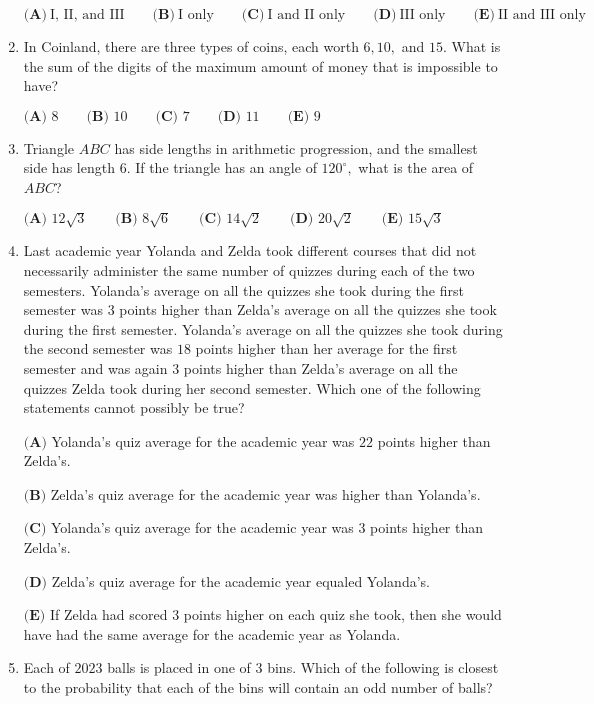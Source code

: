 \documentclass{article}
\begin{document}
\begin{enumerate}[label=\arabic*., itemsep=0.5em]
\(\textbf{(A)}~\text{I, II, and III}\qquad\textbf{(B)}~\text{I only}\qquad\textbf{(C)}~\text{I and II only}\qquad\textbf{(D)}~\text{III only}\qquad\textbf{(E)}~\text{II and III only}\)\par \vspace{0.5em}\item In Coinland, there are three types of coins, each worth \(6, 10,\) and \(15.\) What is the sum of the digits of the maximum amount of money that is impossible to have?

\(\textbf{(A) }8\qquad\textbf{(B) }10\qquad\textbf{(C) }7\qquad\textbf{(D) }11\qquad\textbf{(E) }9\)\par \vspace{0.5em}\item Triangle \(ABC\) has side lengths in arithmetic progression, and the smallest side has length \(6\). If the triangle has an angle of \(120^\circ,\) what is the area of \(ABC\)?

\(\textbf{(A) }12\sqrt{3}\qquad\textbf{(B) }8\sqrt{6}\qquad\textbf{(C) }14\sqrt{2}\qquad\textbf{(D) }20\sqrt{2}\qquad\textbf{(E) }15\sqrt{3}\)\par \vspace{0.5em}\item Last academic year Yolanda and Zelda took different courses that did not necessarily administer the same number of quizzes during each of the two semesters. Yolanda's average on all the quizzes she took during the first semester was \(3\) points higher than Zelda's average on all the quizzes she took during the first semester. Yolanda's average on all the quizzes she took during the second semester was \(18\) points higher than her average for the first semester and was again \(3\) points higher than Zelda's average on all the quizzes Zelda took during her second semester. Which one of the following statements cannot possibly be true?

\(\textbf{(A)}\) Yolanda's quiz average for the academic year was \(22\) points higher than Zelda's.

\(\textbf{(B)}\) Zelda's quiz average for the academic year was higher than Yolanda's.

\(\textbf{(C)}\) Yolanda's quiz average for the academic year was \(3\) points higher than Zelda's.

\(\textbf{(D)}\) Zelda's quiz average for the academic year equaled Yolanda's.

\(\textbf{(E)}\) If Zelda had scored \(3\) points higher on each quiz she took, then she would have had the same average for the academic year as Yolanda.\par \vspace{0.5em}\item Each of \(2023\) balls is placed in one of \(3\) bins. Which of the following is closest to the probability that each of the bins will contain an odd number of balls?


\end{enumerate}
\end{document}
